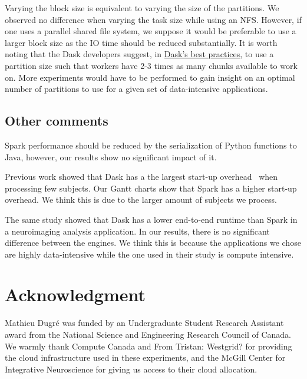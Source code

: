\documentclass[conference]{IEEEtran}
\newcommand{\TG}[1]{\color{cyan}From Tristan: #1 \color{black}}
\begin{document}
Varying the block size is equivalent to varying the size of the partitions. We
observed no difference when varying the task size while using an NFS. However, if
one uses a parallel shared file system, we suppose it would be preferable to use a
larger block size as the IO time should be reduced substantially. It is worth noting
that the Dask developers suggest, in
\href{https://docs.dask.org/en/latest/best-practices.html}{Dask's best practices}, to
use a partition size such that workers have 2-3 times as many chunks available to
work on. More experiments would have to be performed to gain insight on an optimal
number of partitions to use for a given set of data-intensive applications.

\subsection{Other comments}
Spark performance should be reduced by the serialization of Python functions to Java,
however, our results show no significant impact of it. 

Previous work showed that Dask has a the largest start-up overhead~\cite{Mehta:17}
when processing few subjects. Our Gantt charts show that Spark has a higher start-up
overhead. We think this is due to the larger amount of subjects we process.

The same study showed that Dask has a lower end-to-end runtime than Spark in a
neuroimaging analysis application. In our results, there is no significant difference
between the engines. We think this is because the applications we chose are highly
data-intensive while the one used in their study is compute intensive.




\section*{Acknowledgment}

Mathieu Dugr\'e was funded by an Undergraduate Student Research Assistant award from
the National Science and Engineering Research Council of Canada. We warmly thank
Compute Canada and \TG{Westgrid?} for providing the cloud infrastructure used in
these experiments, and the McGill Center for Integrative Neuroscience for giving us
access to their cloud allocation.



\end{document}
